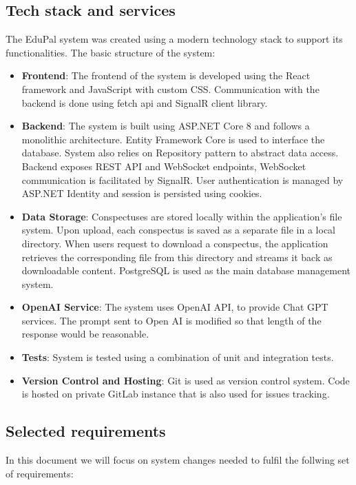\documentclass[
    english, %
]{VUMIFPSkursinis}
\begin{document}
\subsection{Tech stack and services}

The EduPal system was created using a modern technology stack to support its functionalities. The basic structure of the system:

\begin{itemize}
    \item \textbf{Frontend}: The frontend of the system is developed using the React framework and JavaScript with custom CSS. Communication with the backend is done using fetch api and SignalR client library.
    \item \textbf{Backend}: The system is built using ASP.NET Core 8 and follows a monolithic architecture. Entity Framework Core is used to interface the database. System also relies on Repository pattern to abstract data access. Backend exposes REST API and WebSocket endpoints, WebSocket communication is facilitated by SignalR. User authentication is managed by ASP.NET Identity and session is persisted using cookies.
          \item\textbf{Data Storage}: Conspectuses are stored locally within the application's file system. Upon upload, each conspectus is saved as a separate file in a local directory. When users request to download a conspectus, the application retrieves the corresponding file from this directory and streams it back as downloadable content. PostgreSQL is used as the main database management system.
    \item \textbf{OpenAI Service}: The system uses OpenAI API, to provide Chat GPT services. The prompt sent to Open AI is modified so that length of the response would be reasonable.
    \item \textbf{Tests}: System is tested using a combination of unit and integration tests.
    \item \textbf{Version Control and Hosting}: Git is used as version control system. Code is hosted on private GitLab instance that is also used for issues tracking.
\end{itemize}

\subsection{Selected requirements}
In this document we will focus on system changes needed to fulfil the follwing set of requirements:
\end{document}

